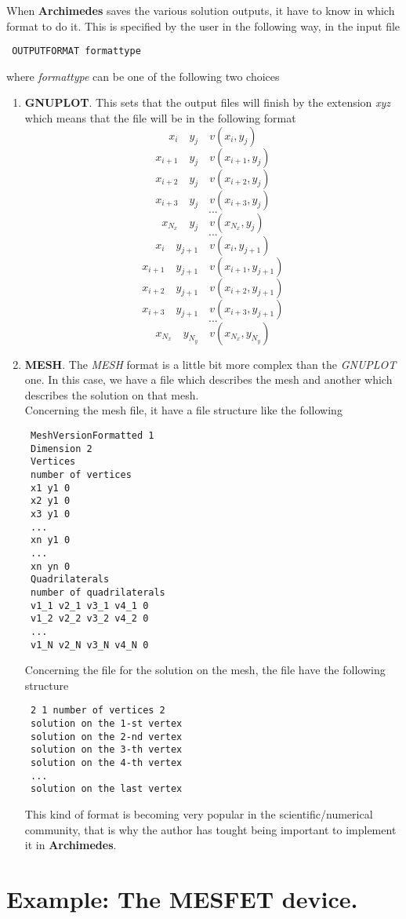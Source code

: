 \documentclass[12pt]{book}
\begin{document}
When \textbf{Archimedes} saves the various solution outputs, it have to know in which format to do it. This is specified by the user in the following way, in the input file
\begin{verbatim}
 OUTPUTFORMAT formattype
\end{verbatim}
where \textsl{formattype} can be one of the following two choices
\begin{enumerate}
\item 
\textbf{GNUPLOT}. This sets that the output files will finish by the extension \textsl{xyz} which means that the file will be in the following format\\
$$ x_i \quad y_j \quad v(x_i,y_j) $$
$$ x_{i+1} \quad y_j \quad v(x_{i+1},y_j) $$
$$ x_{i+2} \quad y_j \quad v(x_{i+2},y_j) $$
$$ x_{i+3} \quad y_j \quad v(x_{i+3},y_j) $$
$$ ... $$
$$ x_{N_x} \quad y_j \quad v(x_{N_x},y_j) $$
$$ ... $$
$$ x_i \quad y_{j+1} \quad v(x_i,y_{j+1}) $$
$$ x_{i+1} \quad y_{j+1} \quad v(x_{i+1},y_{j+1}) $$
$$ x_{i+2} \quad y_{j+1} \quad v(x_{i+2},y_{j+1}) $$
$$ x_{i+3} \quad y_{j+1} \quad v(x_{i+3},y_{j+1}) $$
$$ ... $$
$$ x_{N_x} \quad y_{N_y} \quad v(x_{N_x},y_{N_y}) $$
\item
\textbf{MESH}. The \textsl{MESH} format is a little bit more complex than the \textsl{GNUPLOT} one. In this case, we have a file which describes the mesh and another which describes the solution on that mesh.\\
Concerning the mesh file, it have a file structure like the following
\begin{verbatim}
 MeshVersionFormatted 1
 Dimension 2
 Vertices
 number of vertices
 x1 y1 0
 x2 y1 0
 x3 y1 0
 ...
 xn y1 0
 ...
 xn yn 0
 Quadrilaterals
 number of quadrilaterals
 v1_1 v2_1 v3_1 v4_1 0
 v1_2 v2_2 v3_2 v4_2 0
 ...
 v1_N v2_N v3_N v4_N 0
\end{verbatim}

Concerning the file for the solution on the mesh, the file have the following structure
\begin{verbatim}
 2 1 number of vertices 2
 solution on the 1-st vertex
 solution on the 2-nd vertex
 solution on the 3-th vertex
 solution on the 4-th vertex
 ...
 solution on the last vertex
\end{verbatim}
This kind of format is becoming very popular in the scientific/numerical community, that is why the author has tought being important to implement it in \textbf{Archimedes}.
\end{enumerate}


\chapter{Example: The MESFET device.}
\end{document}
